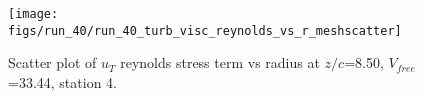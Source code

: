 \begin{figure}[H]
\centering
\texttt{[image: figs/run\_40/run\_40\_turb\_visc\_reynolds\_vs\_r\_meshscatter]}
\caption{Scatter plot of $
u_T$ reynolds stress term vs radius at $z/c$=8.50, $V_{free}$=33.44, station 4.}
\label{fig:run_40_turb_visc_reynolds_vs_r_meshscatter}
\end{figure}


